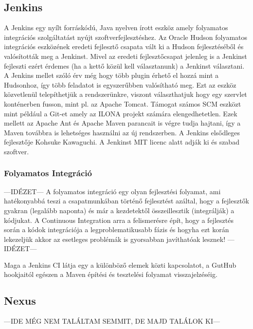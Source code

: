 \subsection{Jenkins}
A Jenkins egy nyílt forráskódú, Java nyelven írott eszköz amely folyamatos integrációs szolgáltatást nyújt szoftverfejlesztéshez. 
Az Oracle Hudson folyamatos integrációs eszközének eredeti fejlesztő csapata vált ki a Hudson fejlesztéséből és valósították meg a Jenkinst. 
Mivel az eredeti fejlesztőcsapat jelenleg is a Jenkinst fejleszti ezért érdemes (ha a kettő közül kell választanunk) a Jenkinst választani. 
A Jenkins mellet szóló érv még hogy több plugin érhető el hozzá mint a Hudsonhoz, így több feladatot is egyszerűbben valósítható meg. 
Ezt az eszköz közvetlenül telepíthetjük a rendszerünkre, viszont választhatjuk hogy egy szervlet konténerben fusson, mint pl. az Apache Tomcat. 
Támogat számos SCM eszközt mint például a Git-et amely az ILONA projekt számára elengedhetetlen. 
Ezek mellett az Apache Ant és Apache Maven parancait is végre tudja hajtani, így a Maven továbbra is lehetséges használni az új rendszerben. 
A Jenkins elsődleges fejlesztője Kohsuke Kawaguchi. A Jenkinst MIT licenc alatt adják ki és szabad szoftver. 

\subsubsection{Folyamatos Integráció}

---IDÉZET---
A folyamatos integráció egy olyan fejlesztési folyamat, ami hatékonyabbá teszi a csapatmunkában történő fejlesztést azáltal, hogy a fejlesztők gyakran (legalább naponta) és már a kezdetektől összeillesztik (integrálják) a kódjukat. A Continuous Integration arra a felismerésre épít, hogy a fejlesztés során a kódok integrációja a legproblematikusabb fázis és hogyha ezt korán lekezeljük akkor az esetleges problémák is gyorsabban javíthatóak lesznek!
---IDÉZET---

Maga a Jenkins CI látja egy a különböző elemek közti kapcsolatot, a GutHub hookjaitól egészen a Maven építési és tesztelési folyamat visszajelzéséig. 

\subsection{Nexus}

---IDE MÉG NEM TALÁLTAM SEMMIT, DE MAJD TALÁLOK KI---